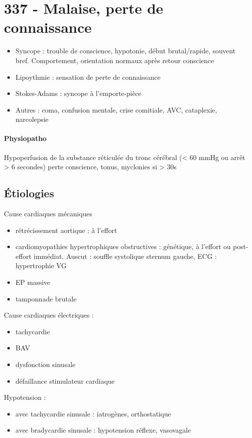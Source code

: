 \section{337 - Malaise, perte de connaissance}%
\label{sec:337_malaise_perte_de_connaissance}
\begin{itemize}
  \item Syncope : trouble de conscience, hypotonie, début brutal/rapide, souvent
    bref. Comportement, orientation normaux après retour conscience
  \item Lipoythmie : sensation de perte de connaissance
  \item Stokes-Adams : syncope à l'emporte-pièce
  \item Autres : coma, confusion mentale, crise comitiale, AVC, cataplexie,
    narcolepsie
\end{itemize}

\paragraph{Physiopatho}
Hypoperfusion de la substance réticulée du tronc cérébral (< 60 mmHg ou arrêt >
6 secondes) \thus perte conscience, tonus, myclonies si > 30s

\subsection{Étiologies}
Cause cardiaques mécaniques
\begin{itemize}
  \item rétrécissement aortique : à l'effort
  \item cardiomyopathies hypertrophiques obstructives : génétique, à l'effort ou
    post-effort immédiat. Auscut : souffle systolique sternum gauche, ECG :
    hypertrophie VG
  \item EP massive
  \item tamponnade brutale
\end{itemize}

Cause cardiaques électriques :
\begin{itemize}
  \item tachycardie
  \item BAV
  \item dysfonction sinusale
  \item défaillance stimulateur cardiaque
\end{itemize}

Hypotension :
\begin{itemize}
  \item avec tachycardie sinusale : iatrogènes, orthostatique
  \item avec bradycardie sinusale : hypotension réflexe, vasovagale
\end{itemize}

